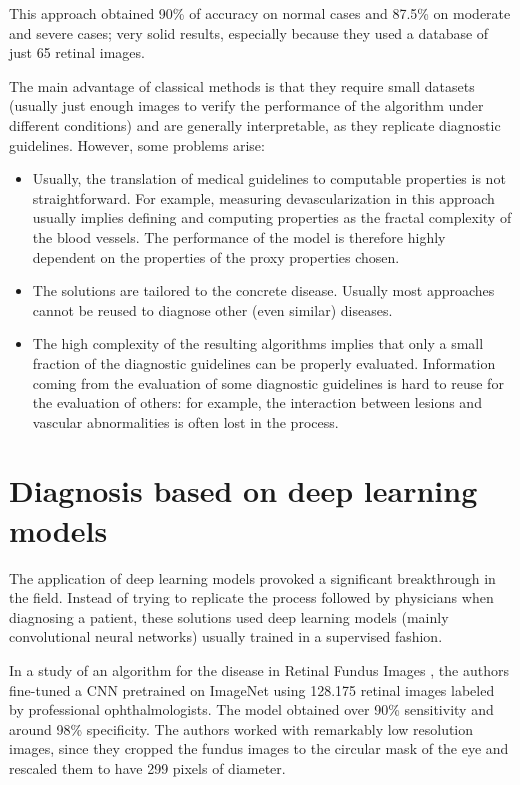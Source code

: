 This approach obtained 90\% of accuracy on normal cases and 87.5\%  on moderate and severe cases; very solid results, especially because they used a database of just 65 retinal images.

The main advantage of classical methods is that they require small datasets (usually just enough images to verify the performance of the algorithm under different conditions) and are generally interpretable, as they replicate diagnostic guidelines. However, some problems arise:
\begin{itemize}
    \item Usually, the translation of medical guidelines to computable properties is not straightforward. For example, measuring devascularization in this approach usually implies defining and computing properties as the fractal complexity of the blood vessels. The performance of the model is therefore highly dependent on the properties of the proxy properties chosen. 
    \item The solutions are tailored to the concrete disease. Usually most approaches cannot be reused to diagnose other (even similar) diseases. 
    \item The high complexity of the resulting algorithms implies that only a small fraction of the diagnostic guidelines can be properly evaluated. Information coming from the evaluation of some diagnostic guidelines is hard to reuse for the evaluation of others: for example, the interaction between lesions and vascular abnormalities is often lost in the process.
\end{itemize}

\section{Diagnosis based on deep learning models} \label{sec:diagnosis}
The application of deep learning models provoked a significant breakthrough in the field. Instead of trying to replicate the process followed by physicians when diagnosing a patient, these solutions used deep learning models (mainly convolutional neural networks) usually trained in a supervised fashion.

In a study of an algorithm for the disease in Retinal Fundus Images \cite{gulshan2016development}, the authors fine-tuned a CNN pretrained on ImageNet using 128.175 retinal images labeled by professional ophthalmologists. The model obtained over 90\% sensitivity and around 98\% specificity.  The authors worked with remarkably low resolution images, since they cropped the fundus images to the circular mask of the eye and rescaled them to have 299 pixels of diameter. 

